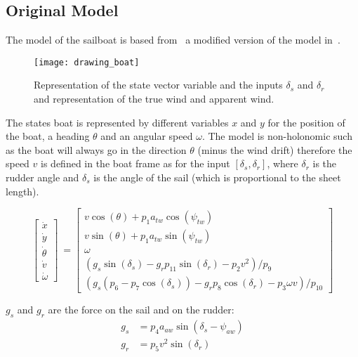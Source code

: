 \subsection{Original Model}

The model of the sailboat is based from~\cite{Melin2016} a modified version of the model in~\cite{LeBars2013}.


\begin{figure}[H]
\centering
    \texttt{[image: drawing\_boat]}
    \caption{Representation of the state vector variable and the inputs $\delta_s$ and $\delta_r$ and representation of the true wind and apparent wind.}
    \label{fig:drawing_boat_ink}
\end{figure}

The states boat is represented by different variables $x$ and $y$ for the position of the boat, a heading $\theta$ 
and an angular speed $\omega$.
The model is non-holonomic such as the boat will always go in the direction $\theta$ (minus the wind drift) therefore the speed $v$ is defined in the boat frame as for the input $[ \delta_s , \delta_r]$, where $\delta_r$ is the rudder angle and $\delta_s$ is the angle of the sail (which is proportional to the sheet length).


\begin{equation}
\begin{bmatrix}
\dot{x}\\
\dot{y}\\
\dot{\theta}\\
\dot{v}\\
\dot{\omega}
\end{bmatrix}\  = \begin{bmatrix}
v \cos(\theta)+p_1 a_{tw} \cos(\psi_{tw})\\
v \sin(\theta)+p_1 a_{tw} \sin(\psi_{tw})\\
\omega\\
(g_s \sin(\delta_s)-g_r p_{11} \sin(\delta_r) - p_2 v^2)/p_9\\
(g_s(p_6-p_7\cos(\delta_s))-g_r p_8 \cos(\delta_r)-p_3 \omega v)/p_{10}
\end{bmatrix}
\end{equation}




$g_s$ and $g_r$ are the force on the sail and on the rudder:
\begin{align}
g_s &= p_4 a_{aw} \sin(\delta_s - \psi_{aw})\\
g_r &= p_5 v^2 \sin(\delta_r)
\end{align}



